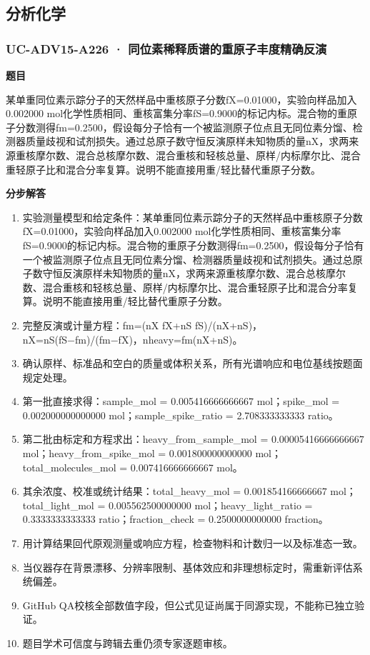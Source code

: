 \documentclass[UTF8,11pt,a4paper]{ctexart}
\begin{document}
\subsection*{分析化学}
\subsubsection*{UC-ADV15-A226 · 同位素稀释质谱的重原子丰度精确反演}
\noindent\textbf{题目}\par
某单重同位素示踪分子的天然样品中重核原子分数fX=0.01000，实验向样品加入0.002000 mol化学性质相同、重核富集分率fS=0.9000的标记内标。混合物的重原子分数测得fm=0.2500，假设每分子恰有一个被监测原子位点且无同位素分馏、检测器质量歧视和试剂损失。通过总原子数守恒反演原样未知物质的量nX，求两来源重核摩尔数、混合总核摩尔数、混合重核和轻核总量、原样/内标摩尔比、混合重轻原子比和混合分率复算。说明不能直接用重/轻比替代重原子分数。\par
\medskip\noindent\textbf{分步解答}
\begin{enumerate}
\item 实验测量模型和给定条件：某单重同位素示踪分子的天然样品中重核原子分数fX=0.01000，实验向样品加入0.002000 mol化学性质相同、重核富集分率fS=0.9000的标记内标。混合物的重原子分数测得fm=0.2500，假设每分子恰有一个被监测原子位点且无同位素分馏、检测器质量歧视和试剂损失。通过总原子数守恒反演原样未知物质的量nX，求两来源重核摩尔数、混合总核摩尔数、混合重核和轻核总量、原样/内标摩尔比、混合重轻原子比和混合分率复算。说明不能直接用重/轻比替代重原子分数。
\item 完整反演或计量方程：fm=(nX fX+nS fS)/(nX+nS)，nX=nS(fS−fm)/(fm−fX)，nheavy=fm(nX+nS)。
\item 确认原样、标准品和空白的质量或体积关系，所有光谱响应和电位基线按题面规定处理。
\item 第一批直接求得：sample\_mol = 0.005416666666667 mol；spike\_mol = 0.002000000000000 mol；sample\_spike\_ratio = 2.708333333333 ratio。
\item 第二批由标定和方程求出：heavy\_from\_sample\_mol = 0.00005416666666667 mol；heavy\_from\_spike\_mol = 0.001800000000000 mol；total\_molecules\_mol = 0.007416666666667 mol。
\item 其余浓度、校准或统计结果：total\_heavy\_mol = 0.001854166666667 mol；total\_light\_mol = 0.005562500000000 mol；heavy\_light\_ratio = 0.3333333333333 ratio；fraction\_check = 0.2500000000000 fraction。
\item 用计算结果回代原观测量或响应方程，检查物料和计数归一以及标准态一致。
\item 当仪器存在背景漂移、分辨率限制、基体效应和非理想标定时，需重新评估系统偏差。
\item GitHub QA校核全部数值字段，但公式见证尚属于同源实现，不能称已独立验证。
\item 题目学术可信度与跨辑去重仍须专家逐题审核。
\end{enumerate}
\end{document}

